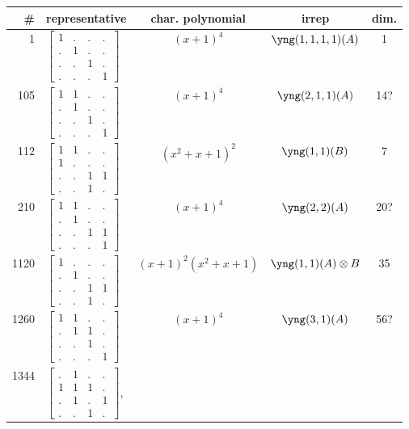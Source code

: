 \documentclass[11pt,oneside]{article}
\newcommand{\tensor}{\otimes}
\begin{document}
\begin{center}
\begin{tabular}{r|l|c|c|c}
\# & representative & char. polynomial & irrep & dim. \\
\hline
1  & $\begin{bmatrix}1&.&.&.\\.&1&.&.\\.&.&1&.\\.&.&.&1\end{bmatrix}$  & $(x+1)^4$  & $\yng(1,1,1,1)(A)$ & 1  \\
105  & $\begin{bmatrix}1&1&.&.\\.&1&.&.\\.&.&1&.\\.&.&.&1\end{bmatrix}$  & $(x+1)^4$  & $\yng(2,1,1)(A)$ & 14?  \\
112  & $\begin{bmatrix}1&1&.&.\\1&.&.&.\\.&.&1&1\\.&.&1&.\end{bmatrix}$  & $(x^2+x+1)^2$  & $\yng(1,1)(B)$ & 7  \\
210  & $\begin{bmatrix}1&1&.&.\\.&1&.&.\\.&.&1&1\\.&.&.&1\end{bmatrix}$  & $(x+1)^4$  & $\yng(2,2)(A)$ & 20?  \\
1120  & $\begin{bmatrix}1&.&.&.\\.&1&.&.\\.&.&1&1\\.&.&1&.\end{bmatrix}$
  & $(x+1)^2(x^2+x+1)$  & $\yng(1,1)(A)\tensor B$ & 35  \\
1260  & $\begin{bmatrix}1&1&.&.\\.&1&1&.\\.&.&1&.\\.&.&.&1\end{bmatrix}$  & $(x+1)^4$  & $\yng(3,1)(A)$ & 56?  \\
1344  & 
$\begin{bmatrix}.&1&.&.\\1&1&1&.\\.&1&.&1\\.&.&1&.\end{bmatrix}$,

\end{tabular}
\end{center}
\end{document}
